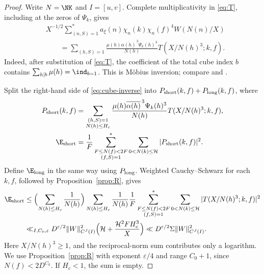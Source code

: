 \begin{proof}
Write $N=\NK$ and $I=[u,v]$. Complete multiplicativity in
\eqref{eq:T}, including at the zeros of $\Psi_k$, gives
\begin{equation}\label{eq:cube-inverse}
 \begin{aligned}
 &X^{-1/2}\sum_{(n,S)=1}^*a_\xi(n)\chi_n(k)\chi_n(f)^4
 W(N(n)/X)\\
 &\qquad=\sum_{(h,S)=1}
 \frac{\mu(h)\overline{\alpha(h)}^{\,3}\Psi_k(h)^3}{N(h)}
 T(X/N(h)^3;k,f).
 \end{aligned}
\end{equation}
Indeed, after substitution of \eqref{eq:T}, the coefficient of the
total cube index $b$ contains
$\sum_{h\mid b}\mu(h)=\ind_{b=1}$.
This is M\"obius inversion; compare \cite[(1.18)]{IK04} and
\cite[(8.2)]{DR}.

Split the right-hand side of \eqref{eq:cube-inverse} into
$P_{\rm short}(k,f)+P_{\rm long}(k,f)$, where
\[
 \begin{aligned}
 P_{\rm short}(k,f)&=
 \sum_{\substack{(h,S)=1\\N(h)\le H_c}}
 \frac{\mu(h)\overline{\alpha(h)}^{\,3}\Psi_k(h)^3}{N(h)}
 T(X/N(h)^3;k,f),\\
 \E_{\rm short}&=\frac1F\sum_{\substack{F\le N(f)<2F\\(f,S)=1}}^*
 \sum_{0<N(k)\le\mathcal H}|P_{\rm short}(k,f)|^2.
 \end{aligned}
\]
Define $\E_{\rm long}$ in the same way using $P_{\rm long}$.
Weighted Cauchy--Schwarz for each $k,f$, followed by
Proposition~\ref{prop:R}, gives
\begin{equation}\label{eq:short-cube-bound}
 \begin{aligned}
 \E_{\rm short}
 &\le\Bigl(\sum_{N(h)\le H_c}\frac1{N(h)}\Bigr)
 \sum_{N(h)\le H_c}\frac1{N(h)} \frac1F\sum_{\substack{F\le N(f)<2F\\(f,S)=1}}^*
 \sum_{0<N(k)\le\mathcal H}|T(X/N(h)^3;k,f)|^2\\
 &\ll_{I,C_0,\varepsilon}
 D^{\varepsilon/2}\|W\|_{C^J(I)}^2
 \Bigl(\mathcal H+\frac{\mathcal H^2FH_c^3}{X}\Bigr)
 \ll D^{\varepsilon/2}\Sigma\|W\|_{C^J(I)}^2.
 \end{aligned}
\end{equation}
Here $X/N(h)^3\ge1$, and the reciprocal-norm sum contributes
only a logarithm. We use Proposition~\ref{prop:R} with exponent
$\varepsilon/4$ and range $C_0+1$, since $N(f)<2D^{C_0}$.
If $H_c<1$, the sum is empty.


\end{proof}
